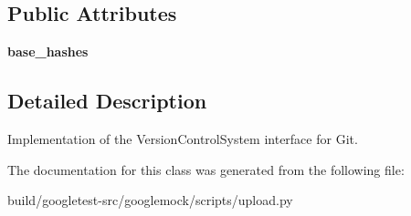 \subsection*{Public Attributes}
\begin{DoxyCompactItemize}
\item 
\mbox{\label{classupload_1_1GitVCS_a07e9469050a157f34fe804cdf6ecddac}} 
{\bfseries base\+\_\+hashes}
\end{DoxyCompactItemize}


\subsection{Detailed Description}
\begin{DoxyVerb}Implementation of the VersionControlSystem interface for Git.\end{DoxyVerb}
 

The documentation for this class was generated from the following file\+:\begin{DoxyCompactItemize}
\item 
build/googletest-\/src/googlemock/scripts/upload.\+py\end{DoxyCompactItemize}
